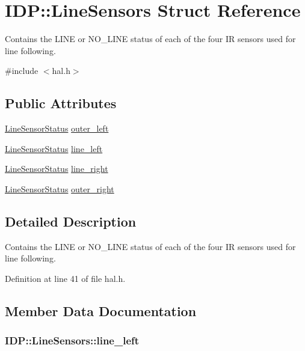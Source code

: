 \hypertarget{structIDP_1_1LineSensors}{
\section{IDP::LineSensors Struct Reference}
\label{structIDP_1_1LineSensors}
}


Contains the LINE or NO\_\-LINE status of each of the four IR sensors used for line following.  




{\ttfamily \#include $<$hal.h$>$}

\subsection*{Public Attributes}
\begin{DoxyCompactItemize}
\item 
\hyperlink{namespaceIDP_afc3b1d4cbb313bfc854f49d6f23b25f7}{LineSensorStatus} \hyperlink{structIDP_1_1LineSensors_a009bf6abf88cf3c732545da20148ba5e}{outer\_\-left}
\item 
\hyperlink{namespaceIDP_afc3b1d4cbb313bfc854f49d6f23b25f7}{LineSensorStatus} \hyperlink{structIDP_1_1LineSensors_ab986b625016c2f99536299b6d0af3f29}{line\_\-left}
\item 
\hyperlink{namespaceIDP_afc3b1d4cbb313bfc854f49d6f23b25f7}{LineSensorStatus} \hyperlink{structIDP_1_1LineSensors_a03e1692ac462e2e6744c9d5a7656c6f1}{line\_\-right}
\item 
\hyperlink{namespaceIDP_afc3b1d4cbb313bfc854f49d6f23b25f7}{LineSensorStatus} \hyperlink{structIDP_1_1LineSensors_afa87dc008f415429d15e35a49d52083c}{outer\_\-right}
\end{DoxyCompactItemize}


\subsection{Detailed Description}
Contains the LINE or NO\_\-LINE status of each of the four IR sensors used for line following. 

Definition at line 41 of file hal.h.



\subsection{Member Data Documentation}
\hypertarget{structIDP_1_1LineSensors_ab986b625016c2f99536299b6d0af3f29}{
\subsubsection[{line\_\-left}]{ {\bf IDP::LineSensors::line\_\-left}}}
\label{structIDP_1_1LineSensors_ab986b625016c2f99536299b6d0af3f29}


